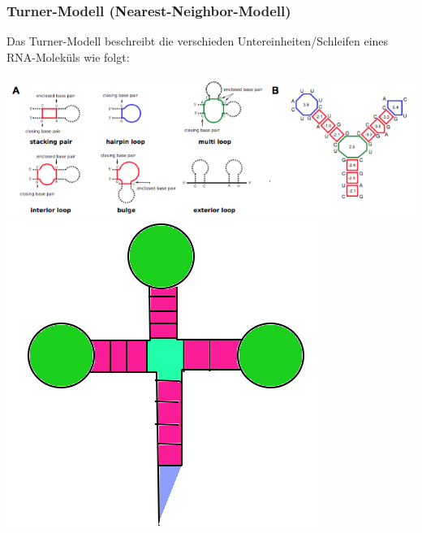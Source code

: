 \subsubsection{Turner-Modell (Nearest-Neighbor-Modell)}
Das Turner-Modell beschreibt die verschieden Untereinheiten/Schleifen eines RNA-Molek\"uls wie folgt:\\\\
\includegraphics[scale=0.6]{lectures/160404_2/pix/nn-model}\\
\includegraphics[scale=0.4]{lectures/160404_2/pix/turner}

